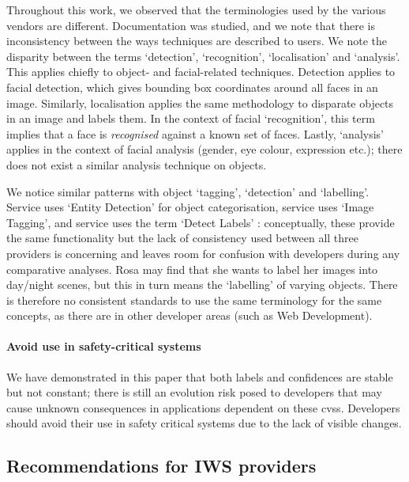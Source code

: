 Throughout this work, we observed that the terminologies used by the various vendors are different. Documentation was studied, and we note that there is inconsistency between the ways techniques are described to users. We note the disparity between the terms `detection', `recognition', `localisation' and `analysis'. This applies chiefly to object- and facial-related techniques. Detection applies to facial detection, which gives bounding box coordinates around all faces in an image. Similarly, localisation applies the same methodology to disparate objects in an image and labels them. In the context of facial `recognition', this term implies that a face is \textit{recognised} against a known set of faces. Lastly, `analysis' applies in the context of facial analysis (gender, eye colour, expression etc.); there does not exist a similar analysis technique on objects.

We notice similar patterns with object `tagging', `detection' and `labelling'. Service \googleapi{} uses `Entity Detection' for object categorisation, service \azureapi{} uses `Image Tagging', and service \awsapi{} uses the term `Detect Labels' : conceptually, these provide the same functionality but the lack of consistency used between all three providers is concerning and leaves room for confusion with developers during any comparative analyses. Rosa may find that she wants to label her images into day/night scenes, but this in turn means the `labelling' of varying objects. There is therefore no consistent standards to use the same terminology for the same concepts, as there are in other developer areas (such as Web Development).

\paragraph{Avoid use in safety-critical systems}
 We have demonstrated in this paper that both labels and confidences are stable but not constant; there is still an evolution risk posed to developers that may cause unknown consequences in applications dependent on these \glspl{cvs}. Developers should avoid their use in safety critical systems due to the lack of visible changes.
 
\subsection{Recommendations for IWS providers}

